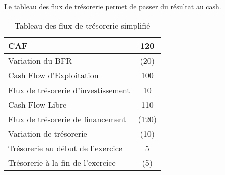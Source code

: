 Le tableau des flux de trésorerie permet de passer du 
résultat au cash.

\begin{table}[h]
\renewcommand{\arraystretch}{1.2}
\footnotesize
\centering
\begin{tabular}{|l|c|}
\hline                                                                                                                                                                
  CAF    & 120 \\
\hline                                                                                                                                                              
  Variation du BFR  & (20) \\
\hline                                                                                                                                                              
  Cash Flow d'Exploitation & 100 \\
\hline  
  Flux de trésorerie d'investissement & 10 \\
\hline     
Cash Flow Libre & 110 \\                                                                                                                                                                                                                                                                                              
\hline                                                                                                                                                                
Flux de trésorerie de financement & (120) \\
\hline     
Variation de trésorerie & (10) \\                                                                                                                                                                                                                                                                                              
\hline  
Trésorerie au début de l'exercice & 5 \\                                                                                                                                                                                                                                                                                              
\hline  
Trésorerie à la fin de l'exercice & (5) \\                                                                                                                                                                                                                                                                                              
\hline  
\end{tabular}
\label{tftex1}
\caption{Tableau des flux de trésorerie simplifié}
\end{table}

